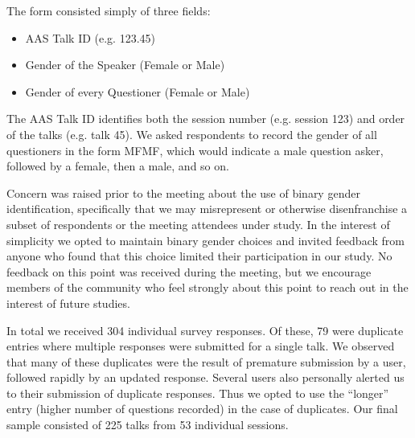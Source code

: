 \documentclass[iop]{emulateapj}
\begin{document}
The form consisted simply of three fields: 
\begin{itemize}
\item AAS Talk ID (e.g. 123.45)
\item Gender of the Speaker (Female or Male)
\item Gender of every Questioner (Female or Male)
\end{itemize}
The AAS Talk ID identifies both the session number (e.g. session 123) and order of the talks (e.g. talk 45). We asked respondents to record the gender of all questioners in the form MFMF, which would indicate a male question asker, followed by a female, then a male, and so on.

Concern was raised prior to the meeting about the use of binary gender identification, specifically that we may misrepresent or otherwise disenfranchise a subset of respondents or the meeting attendees under study.  In the interest of simplicity we opted to maintain binary gender choices and invited feedback from anyone who found that this choice limited their participation in our study. No feedback on this point was received during the meeting, but we encourage members of the community who feel strongly about this point to reach out in the interest of future studies.

In total we received 304 individual survey responses. Of these, 79 were duplicate entries where multiple responses were submitted for a single talk. We observed that many of these duplicates were the result of premature submission by a user, followed rapidly by an updated response. Several users also personally alerted us to their submission of duplicate responses. Thus we opted to use the ``longer'' entry (higher number of questions recorded) in the case of duplicates. Our final sample consisted of 225 talks from 53 individual sessions.



\end{document}
